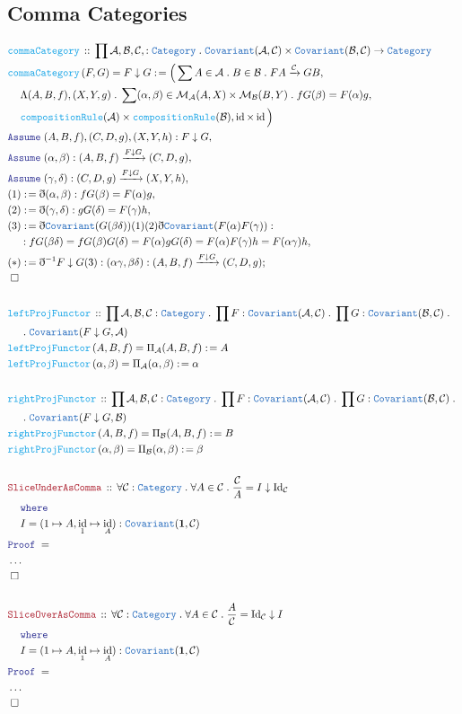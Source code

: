 \documentclass[12pt]{scrartcl}
\newcommand{\TYPE}[1]{\textcolor{NavyBlue}{\mathtt{#1}}}
\newcommand{\FUNC}[1]{\textcolor{Cerulean}{\mathtt{#1}}}
\newcommand{\LOGIC}[1]{\textcolor{Blue}{\mathtt{#1}}}
\newcommand{\THM}[1]{\textcolor{Maroon}{\mathtt{#1}}}
\renewcommand{\.}{\; . \;}
\newcommand{\de}{: \kern 0.1pc =}
\newcommand{\where}{\LOGIC{where}}
\newcommand{\Act}[1]{\left( #1 \right)}
\newcommand{\Theorem}[2]{& \THM{#1} \, :: \, #2 \\ & \Proof = \\ }
\newcommand{\DeclareFunc}[2]{& \FUNC{#1} \, :: \, #2 \\}
\newcommand{\DefineNamedFunc}[4]{&  \FUNC{#1}\Act{#2} = #3 \de #4 \\}
\newcommand{\NewLine}{\\ & \kern 1pc}
\newcommand{\Page}[1]{ \begin{align*} #1 \end{align*}   }
\newcommand{ \bd }{ \ByDef }
\newcommand{\NoProof}{ & \ldots \\ \EndProof}
\DeclareMathOperator*{\id}{id}
\newcommand{\Cat}{\TYPE{Category}}
\newcommand{\Mor}{\mathcal{M}}
\newcommand{\Arrow}{\xrightarrow}
\newcommand{\Say}[3]{& #1 \de #2 : #3, \\}
\newcommand{\Conclude}[3]{& #1 \de #2 : #3; \\}
\newcommand{\Assume}[2]{& \LOGIC{Assume} \; #1 : #2, \\}
\newcommand{\QED}{\; \square}
\newcommand{\EndProof}{& \QED \\}
\newcommand{\ByDef}{\eth}
\newcommand{\Proof}{\LOGIC{Proof} \; }
\newcommand{\Cov}{\TYPE{Covariant}}
\newcommand{\C}{\mathcal{C}}
\begin{document}
\subsection{Comma Categories}
\Page{
	\DeclareFunc{commaCategory}{\prod \mathcal{A},\mathcal{B},\C, : \Cat \. 
		\Cov(\mathcal{A},\C) \times \Cov(\mathcal{B}, \C) \to \Cat}
	\DefineNamedFunc{commaCategory}{ F,G   }{ F \downarrow G }
	{  \Big( \sum A \in \mathcal{A} \.  B \in \mathcal{B} \. FA \Arrow{\C}  GB , \NewLine
		\Lambda (A,B,f),(X,Y,g) \. \sum (\alpha,\beta) \in \Mor_{\mathcal{A}}(A,X) \times \Mor_{\mathcal{B}}(B,Y) \.  
		fG(\beta) = F(\alpha)g, \NewLine
		\FUNC{compositionRule}(\mathcal{A}) \times \FUNC{compositionRule}(\mathcal{B}), \id \times \id
	\Big)}	
	\Assume{(A,B,f),(C,D,g),(X,Y,h)}{F \downarrow G}
	\Assume{ (\alpha,\beta) }{(A,B,f) \Arrow{F \downarrow G} (C,D,g)  }
	\Assume{(\gamma,\delta)}{(C,D,g) \Arrow{F \downarrow G} (X,Y,h)}
	\Say{ (1)  }{\bd (\alpha,\beta)}{ fG(\beta) = F(\alpha)g  }
	\Say{ (2) }{\bd(\gamma,\delta)}{ gG(\delta) = F(\gamma)h }
	\Say{ (3) }{ \bd \Cov(G(\beta\delta))(1)(2)\bd \Cov(F(\alpha)F(\gamma))    }
	{  
		\NewLine
		:fG(\beta \delta) = fG(\beta)G(\delta) = F(\alpha)gG(\delta) = F(\alpha)F(\gamma)h = F(\alpha \gamma) h }
	\Conclude{ (*) }{\bd^{-1} F \downarrow G (3)}{ (\alpha\gamma,\beta\delta) : (A,B,f) \Arrow{F \downarrow G} (C,D,g)}
	\EndProof
	\\
	\DeclareFunc{leftProjFunctor}{ \prod \mathcal{A}, \mathcal{B},\C : \Cat \. \prod F : \Cov(\mathcal{A},\C) \. 
		\prod G : \Cov(\mathcal{B},\C) \.  
		\NewLine \. \Cov(F \downarrow G, \mathcal{A}  ) }
	\DefineNamedFunc{leftProjFunctor}{A,B,f}{\Pi_{\mathcal{A}}(A,B,f)}{ A  }
	\DefineNamedFunc{leftProjFunctor}{\alpha,\beta}{\Pi_{\mathcal{A}}(\alpha,\beta)}{\alpha}
	\\
	\DeclareFunc{rightProjFunctor}{ \prod \mathcal{A}, \mathcal{B},\C : \Cat \. \prod F : \Cov(\mathcal{A},\C) \. 
		\prod G : \Cov(\mathcal{B},\C) \.  
		\NewLine \. \Cov(F \downarrow G, \mathcal{B}  ) }
	\DefineNamedFunc{rightProjFunctor}{A,B,f}{\Pi_{\mathcal{B}}(A,B,f)}{ B  }
	\DefineNamedFunc{rightProjFunctor}{\alpha,\beta}{\Pi_{\mathcal{B}}(\alpha,\beta)}{\beta}
	\\
	\Theorem{SliceUnderAsComma}{\forall \C : \Cat \. \forall A \in \C \. \frac{\C}{A} = I \downarrow \mathrm{Id}_\C
		\NewLine \where \NewLine
		I = ( 1 \mapsto A, \id_1 \mapsto \id_A ) : \Cov(\mathbf{1},\C)	
	}
	\NoProof
	\\
	\Theorem{SliceOverAsComma}{\forall \C : \Cat \. \forall A \in \C \. \frac{A}{\C} =  \mathrm{Id}_\C \downarrow I
		\NewLine \where \NewLine
		I = ( 1 \mapsto A, \id_1 \mapsto \id_A ) : \Cov(\mathbf{1},\C)	
	}
	\NoProof
}
\end{document}

